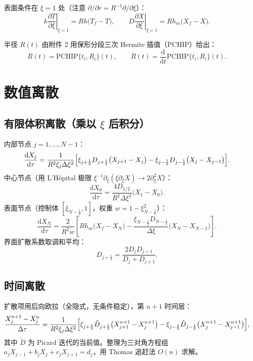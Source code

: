 \documentclass[11pt]{ctexart}
\newcommand{\dd}{\mathrm{d}}
\newcommand{\pd}[2]{\frac{\partial #1}{\partial #2}}
\begin{document}
表面条件在 $\xi=1$ 处（注意 $\partial/\partial r=R^{-1}\partial/\partial\xi$）：
\begin{equation}
k\left.\pd{T}{\xi}\right|_{\xi=1}=Rh\bigl(T_f-T\bigr),
\qquad
D\left.\pd{X}{\xi}\right|_{\xi=1}=Rh_m\bigl(X_f-X\bigr).
\end{equation}

半径 $R(t)$ 由附件 2 用保形分段三次 Hermite 插值（PCHIP）给出：
\begin{equation}
R(t)=\mathrm{PCHIP}\{t_i,R_i\}(t),
\qquad
\dot R(t)=\frac{\dd}{\dd t}\mathrm{PCHIP}\{t_i,R_i\}(t).
\end{equation}

\section{数值离散}

\subsection*{有限体积离散（乘以 $\xi$ 后积分）}
内部节点 $j=1,\dots,N-1$：
\begin{equation}
\frac{\dd X_j}{\dd \tau}
=\frac{1}{R^2\xi_j\Delta\xi^2}
\Bigl[\xi_{j+\frac12}D_{j+\frac12}\bigl(X_{j+1}-X_j\bigr)
-\xi_{j-\frac12}D_{j-\frac12}\bigl(X_j-X_{j-1}\bigr)\Bigr].
\end{equation}
中心节点（用 L'H\^opital 极限 $\xi^{-1}\partial_\xi(\xi\partial_\xi X)\to2\partial_\xi^2X$）：
\begin{equation}
\frac{\dd X_0}{\dd\tau}=\frac{4D_{1/2}}{R^2\Delta\xi^2}\bigl(X_1-X_0\bigr).
\end{equation}
表面节点（控制体 $[\xi_{N-\frac12},1]$，权重 $w=1-\xi_{N-\frac12}^2$）：
\begin{equation}
\frac{\dd X_N}{\dd\tau}
=\frac{2}{R^2w}\left[Rh_m\bigl(X_f-X_N\bigr)
-\frac{\xi_{N-\frac12}D_{N-\frac12}}{\Delta\xi}\bigl(X_N-X_{N-1}\bigr)\right].
\end{equation}
界面扩散系数取调和平均：
\begin{equation}
D_{j+\frac12}=\frac{2D_jD_{j+1}}{D_j+D_{j+1}} .
\end{equation}

\subsection*{时间离散}
扩散项用后向欧拉（全隐式，无条件稳定），第 $n+1$ 时间层：
\begin{equation}
\frac{X_j^{n+1}-X_j^{n}}{\Delta\tau}
=\frac{1}{R^2\xi_j\Delta\xi^2}
\Bigl[\xi_{j+\frac12}\tilde D_{j+\frac12}\bigl(X_{j+1}^{n+1}-X_j^{n+1}\bigr)
-\xi_{j-\frac12}\tilde D_{j-\frac12}\bigl(X_j^{n+1}-X_{j-1}^{n+1}\bigr)\Bigr],
\end{equation}
其中 $\tilde D$ 为 Picard 迭代的当前值。整理为三对角方程组
$a_jX_{j-1}+b_jX_j+c_jX_{j+1}=d_j$，用 Thomas 追赶法 $O(n)$ 求解。
\end{document}
